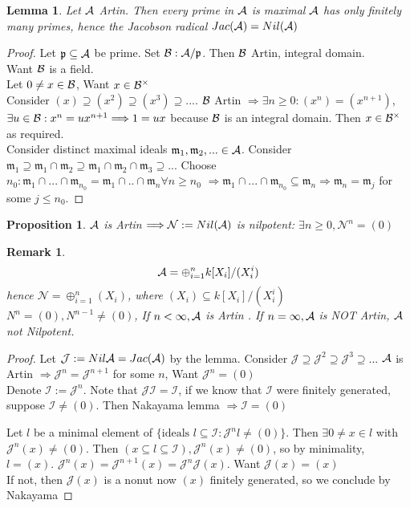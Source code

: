 \documentclass[11pt]{article}
\newtheorem{prop}[thm]{Proposition}
\newtheorem{lemma}[thm]{Lemma}
\newtheorem{rmk}[thm]{Remark}
\newcommand{\scm}{{\mathfrak m}}
\newcommand{\scp}{{\mathfrak p}}
\newcommand{\cala}{{\cal A}}
\newcommand{\calb}{{\cal B}}
\newcommand{\Lrta}{\Longrightarrow}
\begin{document}
\begin{lemma}
Let $\cala$ Artin. Then every prime in $\cala$ is maximal $\cala$ has only finitely many primes, hence the Jacobson radical $Jac(\cala)=Nil(\cala)$
\end{lemma}
\begin{proof}
Let $\scp\subseteq \cala$ be prime. Set $\calb:\cala/\scp$. Then $\calb$ Artin, integral domain.
\\
Want $\calb$ is a field.\\
Let $0\neq x\in \calb$, Want $x\in \calb^\times$\\
Consider $(x)\supseteq (x^2)\supseteq (x^3)\supseteq...$. $\calb$ Artin $\Lrta \exists n\geq 0: (x^n)=(x^{n+1})$, $\exists u\in \calb:x^n=u x^{n+1}\Lrta 1=ux$ because $\calb$ is an integral domain. Then $x\in\calb^{\times}$ as required.\\
Consider distinct maximal ideals $\scm_1,\scm_2,...\in\cala$. Consider $\scm_1\supseteq \scm_1\cap \scm_2\supseteq \scm_1\cap\scm_2\cap \scm_3\supseteq ...$ Choose $n_0: \scm_1\cap...\cap \scm_{n_0}=\scm_1\cap..\cap\scm_n \forall n\geq n_0$ $\Lrta \scm_1\cap...\cap\scm_{n_0}\subseteq \scm_n\Lrta \scm_n=\scm_j$ for some $j\leq n_0$.
\end{proof}

\begin{prop}
$\cala$ is Artin $\Lrta \mathcal{N}:=Nil(\cala)$ is nilpotent: $\exists n\geq 0,\mathcal{N}^n=(0)$
\end{prop}
\begin{rmk}
$$
\cala=\oplus^n_{i=1}k[X_i]/(X^i_i)
$$
hence $\mathcal{N}=\oplus^n_{i=1}(X_i)$, where $(X_i)\subseteq k[X_i]/(X^i_i)$ $N^n=(0), N^{n-1}\neq (0)$, If $n<\infty, \cala$ is Artin . If $n=\infty, \cala$ is NOT Artin, $\cala$ not Nilpotent.
\end{rmk}

\begin{proof}
Let $\mathcal{J}:= Nil{\cala}=Jac(\cala)$ by the lemma. Consider $\mathcal{J}\supseteq \mathcal{J}^2\supseteq \mathcal{J}^3\supseteq ...$ $\cala$ is Artin $\Lrta \mathcal{J}^n=\mathcal{J}^{n+1}$ for some $n$, Want $\mathcal{J}^n=(0)$\\

Denote $\mathcal{I}:=\mathcal{J}^n$. Note that $\mathcal{J}\mathcal{I}=\mathcal{I}$, if we know that $\mathcal{I}$ were finitely generated, suppose $\mathcal{I}\neq (0)$. Then Nakayama lemma $\Lrta \mathcal{I}=(0)$

Let $l$ be a minimal element of $\{\text{ideals $l\subseteq \mathcal{I}:\mathcal{J}^nl\neq (0)$}\}$. Then $\exists 0\neq x\in l$ with $\mathcal{J}^n(x)\neq (0)$. Then $(x\subseteq l\subseteq \mathcal{I}), \mathcal{J}^n (x)\neq (0)$, so by minimality, $l=(x)$.
$\mathcal{J}^n(x)=\mathcal{J}^{n+1}(x)=\mathcal{J}^n\mathcal{J}(x)$.
Want $\mathcal{J}(x)=(x)$\\
If not, then $\mathcal{J}(x)$ is a nonut now $(x)$ finitely generated, so we conclude by Nakayama
\end{proof}
\end{document}
